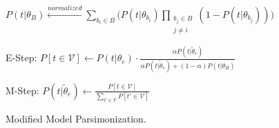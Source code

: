 \begin{algorithm}[t!]
\begin{algorithmic}[1]
     \State \begin{small}$P(t|\theta_B) \xleftarrow{normalized} \sum_{b_i\in B} \bigg(P(t|\theta_{b_i}) \prod_{\substack{b_j\in B \\ j \neq i}} (1-P(t|\theta_{b_j}))\bigg)$ \end{small}
     \Repeat
         \State \begin{small}E-Step: $P[t\in \mathcal{V}] \gets P(t|\theta_e)\cdot \frac{\alpha P(t|\tilde{\theta}_e)}{\alpha P(t|\tilde{\theta}_e) + (1-\alpha) P(t|\theta_B)}$ \end{small}
          \State \begin{small}M-Step: $P(t|\tilde{\theta}_e) \gets \frac{ P[t \in \mathcal{V}]}{\sum_{t' \in \mathcal{V}} P[t' \in \mathcal{V}]}$ \end{small}
 \EndFor
 \EndProcedure
 \end{algorithmic}
 \caption{\label{alg:model_parsimonization}Modified Model Parsimonization.}
\end{algorithm}
